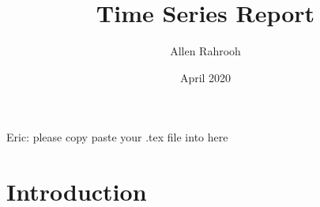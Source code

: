 \documentclass{article}
\title{Time Series Report}
\author{Allen Rahrooh}
\date{April 2020}
\begin{document}
\maketitle

Eric: please copy paste your .tex file into here 

\section{Introduction}
\end{document}
